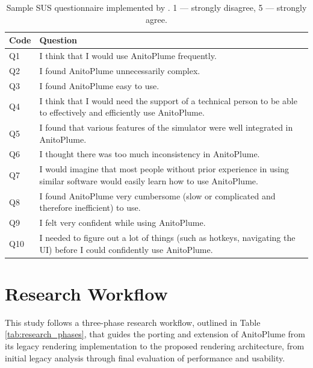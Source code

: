 \begin{table}[H]
\centering
\caption[Sample SUS questionnaire.]{Sample SUS questionnaire implemented by \cite{del2026interactive}. 1 --- strongly disagree, 5 --- strongly agree.}\begin{tabular}{lp{12cm}}
\hline
Code & Question \\
\hline
Q1 & I think that I would use AnitoPlume frequently. \\
Q2 & I found AnitoPlume unnecessarily complex. \\
Q3 & I found AnitoPlume easy to use. \\
Q4 & I think that I would need the support of a technical person to be able to effectively and efficiently use AnitoPlume. \\
Q5 & I found that various features of the simulator were well integrated in AnitoPlume. \\
Q6 & I thought there was too much inconsistency in AnitoPlume. \\
Q7 & I would imagine that most people without prior experience in using similar software would easily learn how to use AnitoPlume. \\
Q8 & I found AnitoPlume very cumbersome (slow or complicated and therefore inefficient) to use. \\
Q9 & I felt very confident while using AnitoPlume. \\
Q10 & I needed to figure out a lot of things (such as hotkeys, navigating the UI) before I could confidently use AnitoPlume. \\
\hline
\end{tabular}
\end{table}


\section{Research Workflow}

This study follows a three-phase research workflow, outlined in Table \ref{tab:research_phases}, that guides the porting and extension of AnitoPlume from its legacy rendering implementation to the proposed rendering architecture, from initial legacy analysis through final evaluation of performance and usability.


